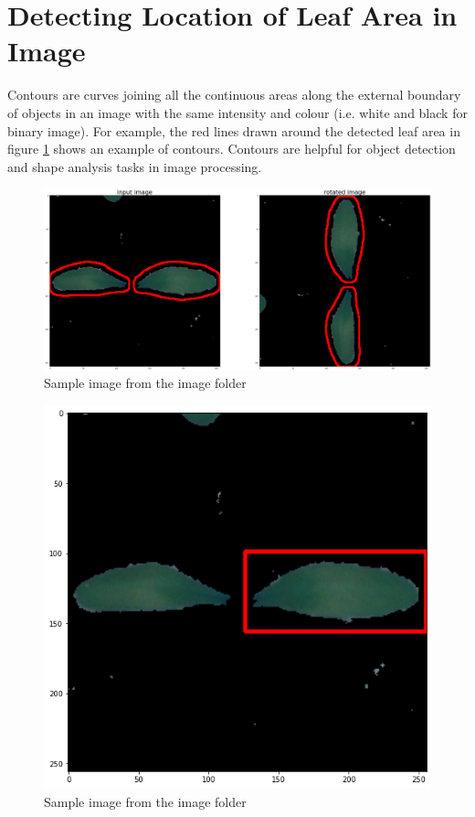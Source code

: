 
\section{Detecting Location of Leaf Area in Image}\label{leaf_location}
Contours are curves joining all the continuous areas along the external boundary of objects in an image with the same intensity and colour (i.e. white and black for binary image). For example, the red lines drawn around the detected leaf area in figure \ref{fig:my_cont_rota} shows an example of contours. Contours are helpful for object detection and shape analysis tasks in image processing.
\begin{figure}[!htb]
    \centering
    \includegraphics[scale=0.15, keepaspectratio]{Figures/contour.png}
    \caption{Sample image from the image folder}
    \label{fig:my_cont_rota}
\end{figure} 
\begin{figure}[!htb]
    \centering
    \includegraphics[scale=0.45, keepaspectratio]{Figures/min_rect.png}
    \caption{Sample image from the image folder}
    \label{fig:my_min_rect}
\end{figure} 

